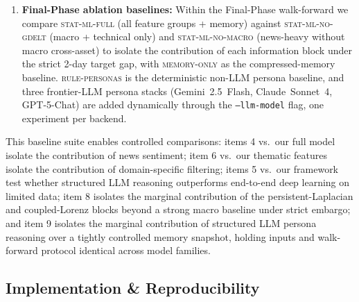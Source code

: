 \documentclass[11pt]{article}
\begin{document}
\begin{sloppypar}
\begin{enumerate}[leftmargin=*]
    \item \textbf{Final-Phase ablation baselines:} Within the Final-Phase walk-forward we compare \textsc{stat-ml-full} (all feature groups + memory) against \textsc{stat-ml-no-gdelt} (macro + technical only) and \textsc{stat-ml-no-macro} (news-heavy without macro cross-asset) to isolate the contribution of each information block under the strict 2-day target gap, with \textsc{memory-only} as the compressed-memory baseline. \textsc{rule-personas} is the deterministic non-LLM persona baseline, and three frontier-LLM persona stacks (Gemini~2.5~Flash, Claude~Sonnet~4, GPT-5-Chat) are added dynamically through the \texttt{--llm-model} flag, one experiment per backend.
\end{enumerate}
\end{sloppypar}

\begin{sloppypar}
This baseline suite enables controlled comparisons: items 4 vs.\ our full model isolate the contribution of news sentiment; item 6 vs.\ our thematic features isolate the contribution of domain-specific filtering; items 5 vs.\ our framework test whether structured LLM reasoning outperforms end-to-end deep learning on limited data; item 8 isolates the marginal contribution of the persistent-Laplacian and coupled-Lorenz blocks beyond a strong macro baseline under strict embargo; and item 9 isolates the marginal contribution of structured LLM persona reasoning over a tightly controlled memory snapshot, holding inputs and walk-forward protocol identical across model families.
\end{sloppypar}

\subsection{Implementation \& Reproducibility}
\end{document}
